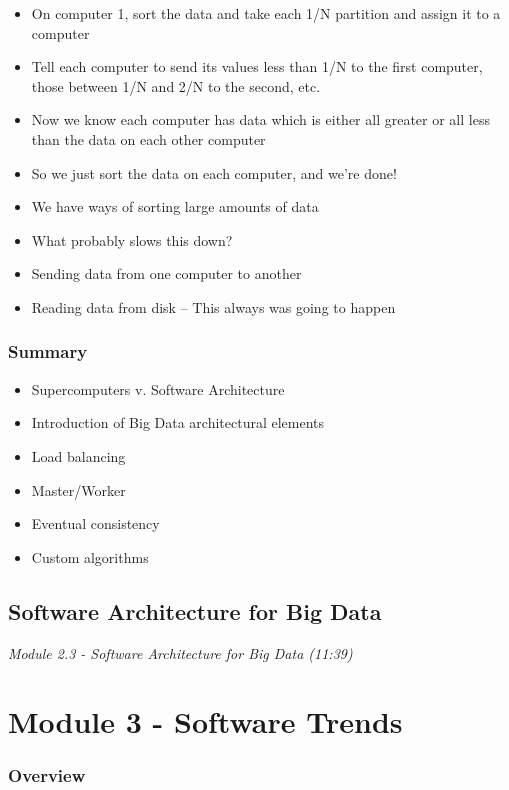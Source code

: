\documentclass[
]{book}
\providecommand{\tightlist}{%
  \setlength{\itemsep}{0pt}\setlength{\parskip}{0pt}}
\begin{document}
\begin{itemize}
\item
  On computer 1, sort the data and take each 1/N partition and assign it to a computer
\item
  Tell each computer to send its values less than 1/N to the first computer, those between 1/N and 2/N to the second, etc.
\item
  Now we know each computer has data which is either all greater or all less than the data on each other computer
\item
  So we just sort the data on each computer, and we're done!
\item
  We have ways of sorting large amounts of data
\item
  What probably slows this down?
\item
  Sending data from one computer to another
\item
  Reading data from disk -- This always was going to happen
\end{itemize}

\subsection{Summary}\label{summary-2}

\begin{itemize}
\tightlist
\item
  Supercomputers v. Software Architecture
\item
  Introduction of Big Data architectural elements
\item
  Load balancing
\item
  Master/Worker
\item
  Eventual consistency
\item
  Custom algorithms
\end{itemize}

\section{Software Architecture for Big Data}\label{software-architecture-for-big-data}

\emph{Module 2.3 - Software Architecture for Big Data (11:39)}

\chapter{Module 3 - Software Trends}\label{module-3---software-trends}

\subsection{Overview}\label{overview-2}
\end{document}
